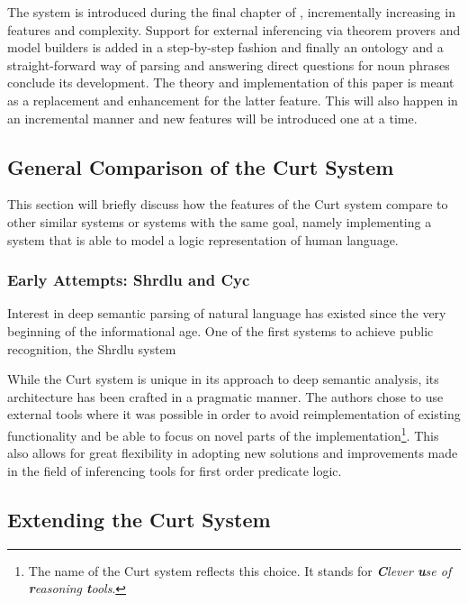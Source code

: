 \documentclass[12pt,a4paper]{article}
\newcommand{\pn}{\textsf} %
\theoremstyle{remark} \newtheorem*{termin}{Definition} %
\begin{document}
The system is introduced during the final chapter of \cite{blackburnbos:cl1},
incrementally increasing in features and complexity. Support for external
inferencing via theorem provers and model builders is added in a step-by-step
fashion and finally an ontology and a straight-forward way of parsing and
answering direct questions for noun phrases conclude its development. The theory
and implementation of this paper is meant as a replacement and enhancement for
the latter feature. This will also happen in an incremental manner and new
features will be introduced one at a time.

\subsection{General Comparison of the Curt System}\label{sec:comparision}

This section will briefly discuss how the features of the Curt system compare to
other similar systems or systems with the same goal, namely implementing a
system that is able to model a logic representation of human language.

\subsubsection{Early Attempts: \pn{Shrdlu} and \pn{Cyc}}

Interest in deep semantic parsing of natural language has existed since the very
beginning of the informational age. One of the first systems to achieve public
recognition, the \pn{Shrdlu} system 

While the \pn{Curt} system is unique in its approach to deep semantic analysis, its
architecture has been crafted in a pragmatic manner. The authors chose to use
external tools where it was possible in order to avoid reimplementation of
existing functionality and be able to focus on novel parts of the
implementation\footnote{The name of the \pn{Curt} system reflects this choice.
It stands for \emph{\textbf{C}lever \textbf{u}se of \textbf{r}easoning
\textbf{t}ools}.}. This also allows for great flexibility in adopting new
solutions and improvements made in the field of inferencing tools for first
order predicate logic.

\subsection{Extending the Curt System}
\end{document}
